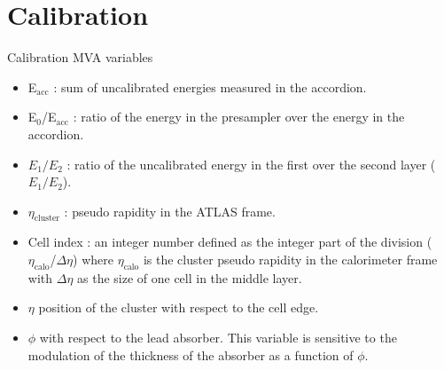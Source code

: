 \section{Calibration}
\begin{frame}{Calibration MVA variables}
  \begin{itemize}
  \item E\(_{\text{acc}}\) : sum of uncalibrated energies measured in the accordion.
  \item E\(_{\text{0}}\)/E\(_{\text{acc}}\) : ratio of the energy in the presampler over the energy in the accordion.
  \item $E_1/E_2$ : ratio of the uncalibrated energy in the first over the second layer ($E_1/E_2$).
  \item \(\eta_{\text{cluster}}\) :  pseudo rapidity in the ATLAS frame.
  \item Cell index : an integer number defined as the integer part of the division ( \(\eta_{\text{calo}}\)/\(\Delta \eta\)) where \(\eta_{\text{calo}}\) is the cluster pseudo rapidity in the calorimeter frame with \(\Delta \eta\) as the size of one cell in the middle layer. 
  \item $\eta$ position of the cluster with respect to the cell edge.
  \item $\phi$ with respect to the lead absorber. This variable is sensitive to the modulation of the thickness of the absorber as a function of $\phi$.
  \end{itemize}
\end{frame}

